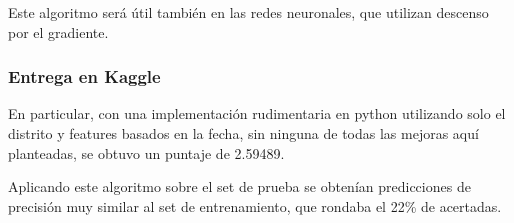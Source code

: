 Este algoritmo será útil también en las redes neuronales, que utilizan descenso por el gradiente.

\subsubsection{Entrega en Kaggle}
En particular, con una implementación rudimentaria en python utilizando solo el distrito y features basados en la fecha, sin ninguna de todas las mejoras aquí planteadas, se obtuvo un puntaje de 2.59489.

Aplicando este algoritmo sobre el set de prueba se obtenían predicciones de precisión muy similar al set de entrenamiento, que rondaba el 22\% de acertadas.

